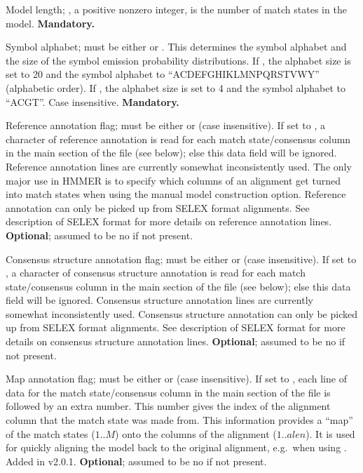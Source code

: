 \begin{wideitem}
\item [\emprog{LENG  <d>}] Model length; , a positive nonzero integer, 
is the number of match states in the model.
\textbf{Mandatory.}

\item [\emprog{ALPH  <s>}] Symbol alphabet;  must be either
 or . This determines the symbol alphabet and the
size of the symbol emission probability distributions.  If
, the alphabet size is set to 20 and the symbol alphabet
to ``ACDEFGHIKLMNPQRSTVWY'' (alphabetic order). If , the
alphabet size is set to 4 and the symbol alphabet to ``ACGT''.  Case
insensitive. \textbf{Mandatory.}

\item [\emprog{RF    <s>}] Reference annotation flag;  must
be either  or  (case insensitive). If set to
, a character of reference annotation is read for each match
state/consensus column in the main section of the file (see below);
else this data field will be ignored.  Reference annotation lines are
currently somewhat inconsistently used. The only major use in HMMER is
to specify which columns of an alignment get turned into match states
when using the
 manual model construction option. Reference
annotation can only be picked up from SELEX format alignments. See
description of SELEX format for more details on reference annotation
lines. \textbf{Optional}; assumed to be no if not present.

\item [\emprog{CS    <s>}] Consensus structure annotation flag;
 must be either  or  (case insensitive). If set to , a character
of consensus structure annotation is read for each match
state/consensus column in the main section of the file (see below);
else this data field will be ignored. Consensus structure annotation
lines are currently somewhat inconsistently used.  Consensus structure
annotation can only be picked up from SELEX format alignments.  See
description of SELEX format for more details on consensus structure
annotation lines. \textbf{Optional}; assumed to be no if not present.

\item [\emprog{MAP   <s>}] Map annotation flag;
 must be either  or  (case insensitive).
If set to , each line of data for the match state/consensus
column in the main section of the file is followed by an extra number.
This number gives the index of the alignment column that the match
state was made from. This information provides a ``map'' of the match
states ($1..M$) onto the columns of the alignment ($1..alen$).  It is
used for quickly aligning the model back to the original alignment,
e.g.\ when using . Added in v2.0.1.
\textbf{Optional}; assumed to be no if not present.


\end{wideitem}
